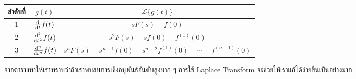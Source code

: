 \documentclass[a4paper,12pt]{article}
\begin{document}
\begin{center}
	\bgroup
	\def\arraystretch{2}
	\begin{tabular}{|c|c|c|}
		\hline
		ลำดับที่ & $g(t)$               & $\mathscr{L}\{g(t)\}$                                       \\
		\hline
		1     & $\diff*{f(t)}{t}$    & $sF(s)-f(0)$                                                \\
		\hline
		2     & $\diff*[2]{f(t)}{t}$ & $s^2F(s)-sf(0)-f^{(1)}(0)$                                  \\
		\hline
		3     & $\diff*[n]{f(t)}{t}$ & $s^nF(s)-s^{n-1}f(0)-s^{n-2}f^{(1)}(0)-\cdots-f^{(n-1)}(0)$ \\
		\hline
	\end{tabular}
	\egroup
\end{center}
จากตารางทำให้เราทราบว่าถ้าเราพบสมการเชิงอนุพันธ์อันดับสูงมาก ๆ การใช้ Laplace Transform จะช่วยให้เราแก้ได้ง่ายขึ้นเป็นอย่างมาก
\end{document}
